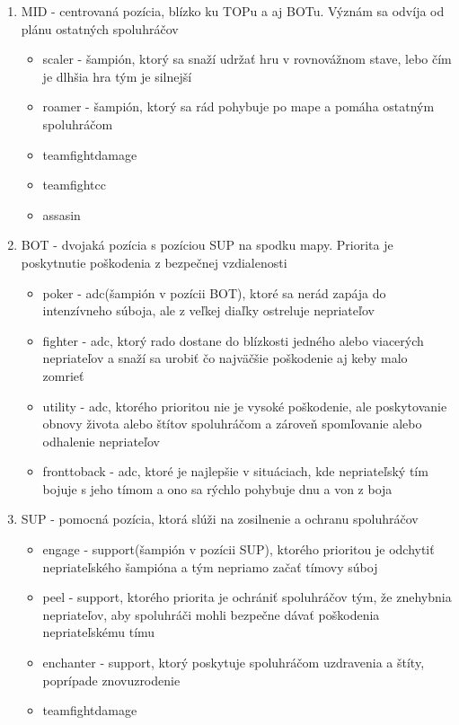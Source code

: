 \begin{enumerate}
\begin{itemize}
	\end{itemize}
	\item MID - centrovaná pozícia, blízko ku TOPu a aj BOTu. Význám sa odvíja od plánu ostatných spoluhráčov
	\begin{itemize}
		\item scaler - šampión, ktorý sa snaží udržať hru v rovnovážnom stave, lebo čím je dlhšia hra tým je silnejší
		\item roamer - šampión, ktorý sa rád pohybuje po mape a pomáha ostatným spoluhráčom
		\item teamfightdamage 
		\item teamfightcc 
		\item assasin
	\end{itemize}
	\item BOT - dvojaká pozícia s pozíciou SUP na spodku mapy. Priorita je poskytnutie poškodenia z bezpečnej vzdialenosti
	\begin{itemize}
		\item poker - adc(šampión v pozícii BOT), ktoré sa nerád zapája do intenzívneho súboja, ale z veľkej diaľky ostreluje nepriateľov
		\item fighter - adc, ktorý rado dostane do blízkosti jedného alebo viacerých nepriateľov a snaží sa urobiť čo najväčšie poškodenie aj keby malo zomrieť 
		\item utility - adc, ktorého prioritou nie je vysoké poškodenie, ale poskytovanie obnovy života alebo štítov spoluhráčom a zároveň spomľovanie alebo odhalenie nepriateľov
		\item fronttoback - adc, ktoré je najlepšie v situáciach, kde nepriateľský tím bojuje s jeho tímom a ono sa rýchlo pohybuje dnu a von z boja
	\end{itemize}
\item SUP - pomocná pozícia, ktorá slúži na zosilnenie a ochranu spoluhráčov
\begin{itemize}
	\item engage - support(šampión v pozícii SUP), ktorého prioritou je odchytiť nepriateľského šampióna a tým nepriamo začať tímovy súboj
	\item peel - support, ktorého priorita je ochrániť spoluhráčov tým, že znehybnia nepriateľov, aby spoluhráči mohli bezpečne dávať poškodenia nepriateľskému tímu
	\item enchanter - support, ktorý poskytuje spoluhráčom uzdravenia a štíty, poprípade znovuzrodenie
	\item teamfightdamage
\end{itemize}
\end{enumerate}
